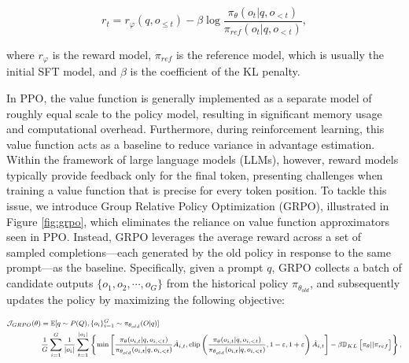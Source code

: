 \begin{itemize}[topsep=0pt]
\begin{itemize}[topsep=0pt]
\begin{equation}
    r_{t} = r_\varphi(q, o_{\le t}) - \beta \log\frac{\pi_{\theta}(o_{t}|q, o_{<t})}{\pi_{ref}(o_{t}|q, o_{<t})},
\label{eq:PPO-reward}
\end{equation}

where $r_\varphi$  is the reward model, $\pi_{ref}$ is the reference model, which is usually the initial SFT model, and $\beta$  is the coefficient of the KL penalty.

In PPO, the value function is generally implemented as a separate model of roughly equal scale to the policy model, resulting in significant memory usage and computational overhead. Furthermore, during reinforcement learning, this value function acts as a baseline to reduce variance in advantage estimation. Within the framework of large language models (LLMs), however, reward models typically provide feedback only for the final token, presenting challenges when training a value function that is precise for every token position. To tackle this issue, we introduce Group Relative Policy Optimization (GRPO), illustrated in Figure \ref{fig:grpo}, which eliminates the reliance on value function approximators seen in PPO. Instead, GRPO leverages the average reward across a set of sampled completions—each generated by the old policy in response to the same prompt—as the baseline. Specifically, given a prompt $q$, GRPO collects a batch of candidate outputs $\{o_1, o_2, \cdots, o_G\}$ from the historical policy $\pi_{\theta_{old}}$, and subsequently updates the policy by maximizing the following objective:

\begin{equation}
\footnotesize
\begin{split}
    \mathcal{J}_{GRPO}(\theta) &= \mathbb{E}{[q \sim P(Q), \{o_i\}_{i=1}^G \sim \pi_{\theta_{old}}(O|q)]}  \\
    & \frac{1}{G}\sum_{i=1}^G\frac{1}{|o_i|} \sum_{t=1}^{|o_i|} \left\{ \min \left[ \frac{\pi_\theta(o_{i,t} | q, o_{i,<t})}{\pi_{\theta_{old}}(o_{i,t} | q, o_{i,<t})} \hat{A}_{i,t}, \text{clip} \left( \frac{\pi_\theta(o_{i,t} | q, o_{i,<t})}{\pi_{\theta_{old}}(o_{i,t} | q, o_{i,<t})}, 1 - \varepsilon, 1 + \varepsilon \right)  \hat{A}_{i,t} \right] - \beta \mathbb{D}_{KL}\left[\pi_{\theta} || \pi_{ref}\right]\right\} ,
\end{split}
\label{eq:GRPO-obj}
\end{equation}


\end{itemize}
\end{itemize}
